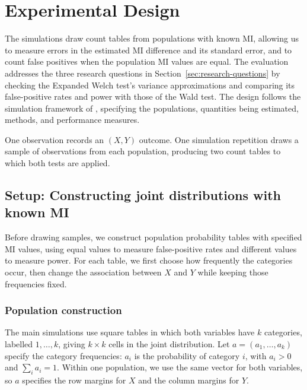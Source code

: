 \chapter{Experimental Design}
\label{chap:design}

The simulations draw count tables from populations with known MI,
allowing us to measure errors in the estimated MI difference and its
standard error, and to count false positives when the population MI
values are equal. The evaluation addresses the three research questions in
Section~\ref{sec:research-questions} by checking the Expanded Welch test's variance
approximations and comparing its false-positive rates and power with those
of the Wald test. The design follows the simulation
framework of \citet{morris2019}, specifying the populations, quantities
being estimated, methods, and performance measures.

One observation records an \((X,Y)\) outcome. One simulation repetition
draws a sample of observations from each population, producing two count
tables to which both tests are applied.

\section{Setup: Constructing joint distributions with known MI}

Before drawing samples, we construct population probability tables with
specified MI values, using equal values to measure false-positive rates
and different values to measure power. For each table,
we first choose how frequently the categories occur, then change the
association between \(X\) and \(Y\) while keeping those frequencies fixed.

\subsection{Population construction}

The main simulations use square tables in which both variables have
\(k\) categories, labelled \(1,\ldots,k\), giving \(k\times k\) cells
in the joint distribution. Let \(a=(a_1,\ldots,a_k)\) specify the category
frequencies: \(a_i\) is the probability of category \(i\), with
\(a_i>0\) and \(\sum_i a_i=1\). Within one population, we use the same vector for both variables,
so \(a\) specifies the row margins for \(X\) and the column margins
for \(Y\).

